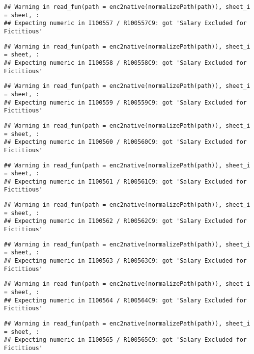 \documentclass[
]{article}
\begin{document}
\begin{verbatim}
## Warning in read_fun(path = enc2native(normalizePath(path)), sheet_i = sheet, :
## Expecting numeric in I100557 / R100557C9: got 'Salary Excluded for Fictitious'
\end{verbatim}

\begin{verbatim}
## Warning in read_fun(path = enc2native(normalizePath(path)), sheet_i = sheet, :
## Expecting numeric in I100558 / R100558C9: got 'Salary Excluded for Fictitious'
\end{verbatim}

\begin{verbatim}
## Warning in read_fun(path = enc2native(normalizePath(path)), sheet_i = sheet, :
## Expecting numeric in I100559 / R100559C9: got 'Salary Excluded for Fictitious'
\end{verbatim}

\begin{verbatim}
## Warning in read_fun(path = enc2native(normalizePath(path)), sheet_i = sheet, :
## Expecting numeric in I100560 / R100560C9: got 'Salary Excluded for Fictitious'
\end{verbatim}

\begin{verbatim}
## Warning in read_fun(path = enc2native(normalizePath(path)), sheet_i = sheet, :
## Expecting numeric in I100561 / R100561C9: got 'Salary Excluded for Fictitious'
\end{verbatim}

\begin{verbatim}
## Warning in read_fun(path = enc2native(normalizePath(path)), sheet_i = sheet, :
## Expecting numeric in I100562 / R100562C9: got 'Salary Excluded for Fictitious'
\end{verbatim}

\begin{verbatim}
## Warning in read_fun(path = enc2native(normalizePath(path)), sheet_i = sheet, :
## Expecting numeric in I100563 / R100563C9: got 'Salary Excluded for Fictitious'
\end{verbatim}

\begin{verbatim}
## Warning in read_fun(path = enc2native(normalizePath(path)), sheet_i = sheet, :
## Expecting numeric in I100564 / R100564C9: got 'Salary Excluded for Fictitious'
\end{verbatim}

\begin{verbatim}
## Warning in read_fun(path = enc2native(normalizePath(path)), sheet_i = sheet, :
## Expecting numeric in I100565 / R100565C9: got 'Salary Excluded for Fictitious'
\end{verbatim}
\end{document}
